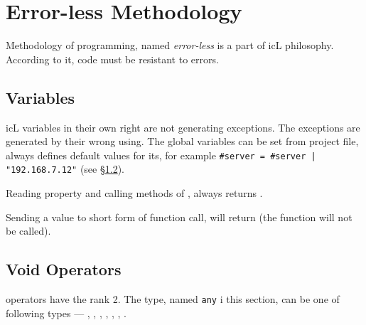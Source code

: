 
\section{Error-less Methodology}

\label{errorless-sec}

Methodology of programming, named {\it error-less} is a part of icL philosophy. According to it, code must be resistant to errors.

\subsection{Variables}

icL variables in their own right are not generating exceptions. The exceptions are generated by their wrong using. The global variables can be set from project file, always defines default values for its, for example \texttt{#server = #server | "192.168.7.12"} (see §\ref{void-operators}).

Reading property and calling methods of \void, always returns \void.

Sending a \void{} value to short form of function call, will return \void{} (the function will not be called). 

\subsection{Void Operators}

\label{void-operators}

\void{} operators have the rank 2. The type, named \texttt{any} i this section, can be one of following types — \integer{}, \double{}, \str{}, \listtype{}, \object{}, \set{}, \element{}.

